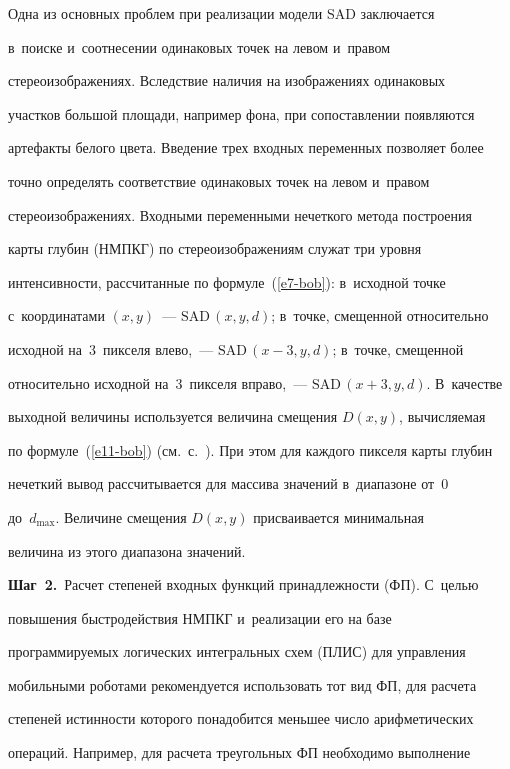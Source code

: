   Одна из основных проблем при реализации модели SAD заключается 


в~поиске и~соотнесении одинаковых точек на левом и~правом 


стереоизображениях. Вследствие наличия на изображениях одинаковых 


участков большой площади, например фона, при сопоставлении появляются 


артефакты белого цвета. Введение трех входных переменных позволяет более 


точно определять соответствие одинаковых точек на левом и~правом 


стереоизображениях. Входными переменными нечеткого метода построения 


карты глубин (НМПКГ) по стереоизображениям  служат три уровня 


интенсивности, рассчитанные по формуле~(\ref{e7-bob}): в~исходной точке 


с~координатами $(x, y)$~--- $\mathrm{SAD}\,(x, y, d)$; в~точке, смещенной относительно 


исходной на~3~пикселя влево,~--- $\mathrm{SAD}\,(x-3, y, d)$; в~точке, смещенной 


относительно исходной на~3~пикселя вправо,~--- $\mathrm{SAD}\,(x+3, y, d)$. В~качестве 


выходной величины используется величина смещения $D(x, y)$, вычисляемая 


по формуле~(\ref{e11-bob}) (см.\ с.~\pageref{e11-bob}). При этом для каждого пикселя карты глубин 


нечеткий вывод рассчитывается для массива значений в~диапазоне от~0 


до~$d_{\max}$. Величине смещения $D(x, y)$ присваивается минимальная 


величина из этого диапазона значений.


  


  \textbf{Шаг~2.}\ Расчет степеней входных функций принадлежности (ФП). С~целью 


повышения быстродействия НМПКГ и~реализации его на базе 


программируемых логических интегральных схем (ПЛИС) для управления 


мобильными роботами рекомендуется использовать тот вид ФП, для расчета 


степеней истинности которого понадобится меньшее число арифметических 


операций. Например, для расчета треугольных ФП необходимо выполнение 



